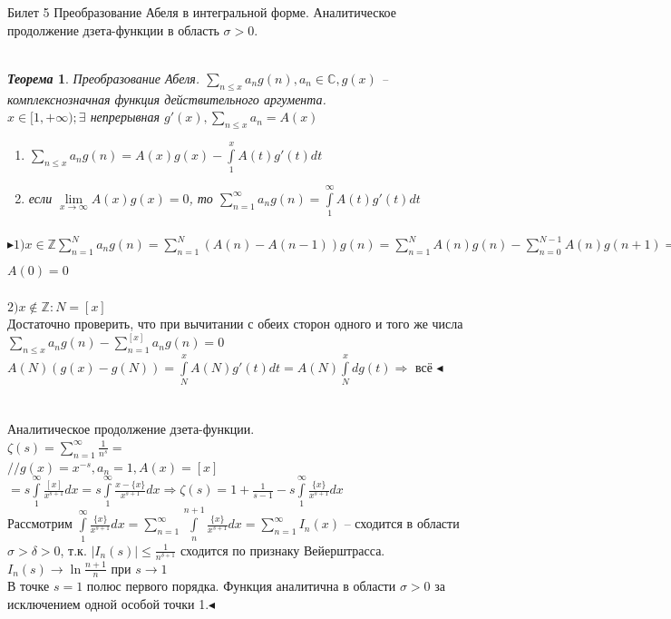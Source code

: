 \documentclass[a4paper,12pt]{article}
\newtheorem{teo}{\textit{Теорема}}
\newcommand{\q}{\quad}
\newcommand{\pb}{\blacktriangleright}
\newcommand{\pe}{\blacktriangleleft}
\newcommand{\Ra}{\Rightarrow}
\newcommand{\bb}[1]{\mathbb{#1}}
\newcommand{\SL}{\sum\limits}
\newcommand{\IL}{\int\limits}
\begin{document}
\newpage
\begin{mybox}{\hypertarget{bil5}{Билет 5}}
Преобразование Абеля в интегральной форме. Аналитическое продолжение дзета-функции в область $\sigma > 0$.\q\\\q\\
\begin{teo}
Преобразование Абеля. $\SL_{n\le x} a_n g(n), a_n\in \bb{C}, g(x)$ -- комплекснозначная функция действительного аргумента.\\
$x\in[1,+\infty); \exists$ непрерывная $g'(x), \SL_{n \le x}a_n = A(x)$\\
\begin{enumerate}
    \item $\SL_{n\le x}a_ng(n) = A(x)g(x) - \IL_1^x A(t)g'(t)dt $
    \item если $\lim\limits_{x\to\infty} A(x)g(x) = 0$, то $\SL_{n=1}^\infty a_ng(n) = \IL_1^\infty A(t)g'(t)dt $
\end{enumerate}
\end{teo}
$\pb 1) x\in \bb{Z} \SL_{n=1}^Na_ng(n) = \SL_{n=1}^N(A(n) - A(n-1))g(n) = \SL_{n=1}^N A(n)g(n) - \SL_{n=0}^{N-1} A(n)g(n+1) = A(N)g(N) - \SL_{n=1}^{N-1} (g(n+1) - g(n))A(n) = A(N)g(N) - \IL_1^N A(t)g'(t)dt  $\\$A(0) = 0$\\\q\\
$2) x\not\in \bb{Z} : N = [x]  $\\
Достаточно проверить, что при вычитании с обеих сторон одного и того же числа\\
$\SL_{n\le x}a_ng(n) - \SL_{n=1}^{[x]}a_ng(n)=0 $\\
$A(N) (g(x) - g(N)) = \IL_N^x A(N)g'(t) dt = A(N)\IL_N^x dg(t)\Ra   $ всё $\pe$\\\q\\\q\\
Аналитическое продолжение дзета-функции.\\
$\zeta(s) = \SL_{n=1}^\infty \frac{1}{n^s} =$\\
$//g(x) = x^{-s}, a_n = 1, A(x) = [x]$\\
$ = s\IL_1^\infty \frac{[x]}{x^{s+1}}dx = s\IL_1^\infty \frac{x-\{x\}}{x^{s+1}}dx \Ra \zeta(s) = 1 + \frac{1}{s-1} - s\IL_1^\infty \frac{\{x\}}{x^{s+1}}dx$\\
Рассмотрим $\IL_1^\infty \frac{\{x\}}{x^{s+1}}dx = \SL_{n=1}^\infty \IL_n^{n+1} \frac{\{x\}}{x^{s+1}}dx = \SL_{n=1}^\infty I_n(x) $ -- сходится в области $\sigma > \delta > 0$, т.к. $|I_n(s)| \le \frac{1}{n^{\delta+1}}$ сходится по признаку Вейерштрасса.\\
$I_n(s)\to \ln\frac{n+1}{n} $ при $s\to 1$\\
В точке $s=1$ полюс первого порядка. Функция аналитична в области $\sigma > 0$ за исключением одной особой точки 1.$\pe$
\end{mybox}
\end{document}
